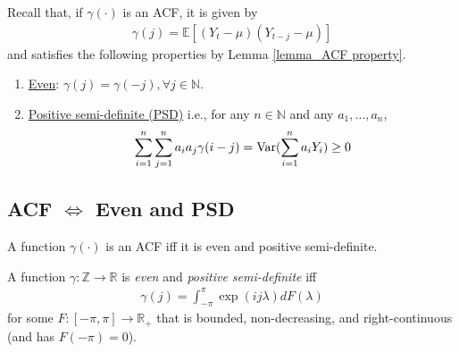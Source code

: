 \documentclass[11pt]{elegantbook}
\begin{document}
Recall that, if $\gamma(\cdot)$ is an ACF, it is given by
\begin{equation}
    \begin{aligned}
        \gamma(j)=\mathbb{E}[(Y_t-\mu)(Y_{t-j}-\mu)]
    \end{aligned}
    \nonumber
\end{equation}
and satisfies the following properties by Lemma \ref{lemma_ACF property}.
\begin{enumerate}
    \item \underline{Even}: $\gamma(j)=\gamma(-j),\forall j\in \mathbb{N}$.
    \item \underline{Positive semi-definite (PSD)} i.e., for any  $n\in \mathbb{N}$ and any $a_1,...,a_n$,
    \begin{equation}
        \begin{aligned}
            \sum_{i=1}^n\sum_{j=1}^na_ia_j\gamma(i-j)=\textnormal{Var}(\sum_{i=1}^na_iY_i)\geq 0
        \end{aligned}
        \nonumber
    \end{equation}
\end{enumerate}
\subsection{ACF $\Leftrightarrow$ Even and PSD}
\begin{proposition}
    A function $\gamma(\cdot)$ is an ACF iff it is even and positive semi-definite.
\end{proposition}

\begin{theorem}
    A function $\gamma: \mathbb{Z}\rightarrow \mathbb{R}$ is \textit{even} and \textit{positive semi-definite} iff
    \begin{equation}
        \begin{aligned}
            \gamma(j)=\int_{-\pi}^\pi \exp\left(ij\lambda\right)d F(\lambda)
        \end{aligned}
        \nonumber
    \end{equation}
    for some $F:[-\pi, \pi] \rightarrow \mathbb{R}_+$ that is bounded, non-decreasing, and right-continuous (and has $F(-\pi)=0$).
\end{theorem}
\end{document}
